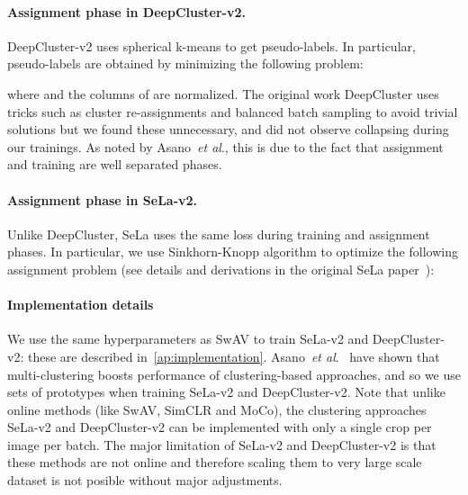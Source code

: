 \documentclass{article}
\def\onedot{.}
\def\etal{\emph{et al}\onedot}
\def\OURS{SwAV\xspace}
\begin{document}
\paragraph{Assignment phase in DeepCluster-v2.}
DeepCluster-v2 uses spherical k-means to get pseudo-labels.
In particular, pseudo-labels  are obtained by minimizing the following problem:

where  and the columns of  are normalized.
The original work DeepCluster uses tricks such as cluster re-assignments and balanced batch sampling to avoid trivial solutions but we found these unnecessary, and did not observe collapsing during our trainings.
As noted by Asano~\etal, this is due to the fact that assignment and training are well separated phases.

\paragraph{Assignment phase in SeLa-v2.}
Unlike DeepCluster, SeLa uses the same loss during training and assignment phases.
In particular, we use Sinkhorn-Knopp algorithm to optimize the following assignment problem (see details and derivations in the original SeLa paper~\cite{asano2019self}):


\paragraph{Implementation details}
We use the same hyperparameters as \OURS to train SeLa-v2 and DeepCluster-v2: these are described in~\cref{ap:implementation}.
Asano~\etal~\cite{asano2019self} have shown that multi-clustering boosts performance of clustering-based approaches, and so we use  sets of  prototypes  when training SeLa-v2 and DeepCluster-v2.
Note that unlike online methods (like \OURS, SimCLR and MoCo), the clustering approaches SeLa-v2 and DeepCluster-v2 can be implemented with only a single crop per image per batch.
The major limitation of SeLa-v2 and DeepCluster-v2 is that these methods are not online and therefore scaling them to very large scale dataset is not posible without major adjustments.
 
\end{document}
